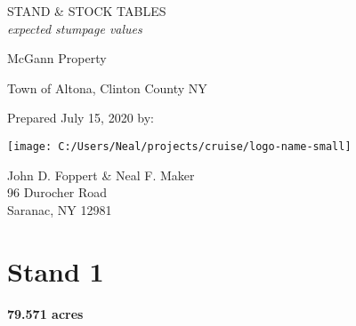 \documentclass[landscape]{article}
\author{}
\date{\vspace{-2.5em}}
\begin{document}
\captionsetup[table]{labelformat=empty}
\captionsetup{justification=raggedright,singlelinecheck=false}

\vspace*{23pt}

\huge STAND \& STOCK TABLES\\
\large \emph{expected stumpage values}

\vspace{18pt}

\LARGE McGann Property

\vspace{16pt}

\Large Town of Altona, Clinton County NY

\vspace{120pt}

\large Prepared July 15, 2020 by:

\vspace{20pt}

\texttt{[image: C:/Users/Neal/projects/cruise/logo-name-small]}

\normalsize John D. Foppert \& Neal F. Maker\\
96 Durocher Road\\
Saranac, NY 12981

\pagebreak
{}

\section{Stand 1}\label{stand-1}

\textbf{79.571 acres}
\end{document}
